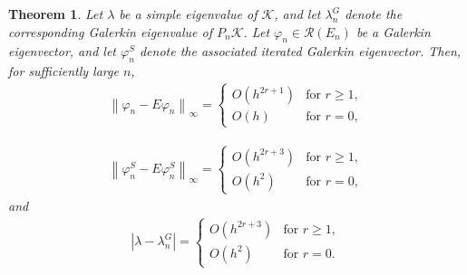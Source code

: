 \documentclass[pdflatex, sn-mathphys-num]{sn-jnl}%
\newcommand{\norm}[1]{\left\lVert #1\right\rVert}
\theoremstyle{thmstyleone}%
\newtheorem{theorem}{Theorem}[section]
\theoremstyle{thmstyletwo}%
\theoremstyle{thmstylethree}%
\begin{document}
\begin{theorem} \label{tp1}
	Let $\lambda$ be a simple eigenvalue of $\mathcal{K}$, and let $\lambda_n^G$ denote the corresponding Galerkin eigenvalue of $P_n \mathcal{K} $. Let $\varphi_n \in \mathcal{R}(E_n)$ be a Galerkin eigenvector, and let $\varphi_n^S$ denote the associated iterated Galerkin eigenvector. 
	Then, for sufficiently large $n$, 
	\begin{eqnarray*} 
		\norm{\varphi_n - E\varphi_n  }_{\infty} = 
		\begin{cases}
			O\left(h^{2r+1} \right) & \text{for } r \geq 1, \\
			O\left(h \right) & \text{for } r = 0,
		\end{cases}
	\end{eqnarray*} 
	
	\begin{eqnarray*}
		\norm{\varphi_n^S - E\varphi_n^S  }_{\infty} =
		\begin{cases}
			O\left(h^{2r+3} \right) & \text{for } r \geq 1, \\
			O\left(h^{2} \right) & \text{for } r = 0,
		\end{cases}
	\end{eqnarray*}
	and 
	\begin{eqnarray*} 
		| \lambda - \lambda_n^G | =
		\begin{cases}
			O\left(h^{2r+3} \right) & \text{for } r \geq 1, \\
			O\left(h^{2} \right) & \text{for } r = 0.
		\end{cases}
	\end{eqnarray*}
\end{theorem}	
\end{document}

